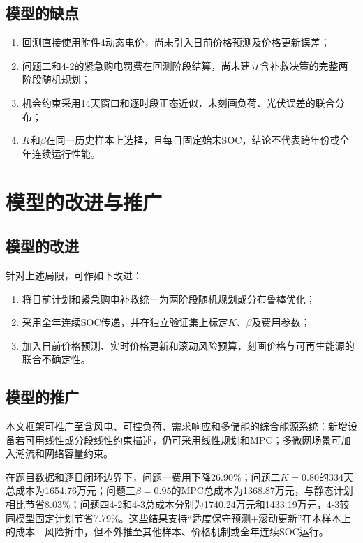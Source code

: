 \documentclass{cumcmthesis}
\begin{document}
\subsection{模型的缺点}

\begin{enumerate}
    \item 回测直接使用附件4动态电价，尚未引入日前价格预测及价格更新误差；
    \item 问题二和4-2的紧急购电罚费在回测阶段结算，尚未建立含补救决策的完整两阶段随机规划；
    \item 机会约束采用14天窗口和逐时段正态近似，未刻画负荷、光伏误差的联合分布；
    \item $K$和$\beta$在同一历史样本上选择，且每日固定始末SOC，结论不代表跨年份或全年连续运行性能。
\end{enumerate}

\section{模型的改进与推广}

\subsection{模型的改进}

针对上述局限，可作如下改进：
\begin{enumerate}
    \item 将日前计划和紧急购电补救统一为两阶段随机规划或分布鲁棒优化；
    \item 采用全年连续SOC传递，并在独立验证集上标定$K$、$\beta$及费用参数；
    \item 加入日前价格预测、实时价格更新和滚动风险预算，刻画价格与可再生能源的联合不确定性。
\end{enumerate}

\subsection{模型的推广}

本文框架可推广至含风电、可控负荷、需求响应和多储能的综合能源系统：新增设备若可用线性或分段线性约束描述，仍可采用线性规划和MPC；多微网场景可加入潮流和网络容量约束。

在题目数据和逐日闭环边界下，问题一费用下降26.90\%；问题二$K=0.80$的334天总成本为1654.76万元；问题三$\beta=0.95$的MPC总成本为1368.87万元，与静态计划相比节省8.03\%；问题四4-2和4-3总成本分别为1740.24万元和1433.19万元，4-3较同模型固定计划节省7.79\%。这些结果支持“适度保守预测+滚动更新”在本样本上的成本—风险折中，但不外推至其他样本、价格机制或全年连续SOC运行。
\end{document}
